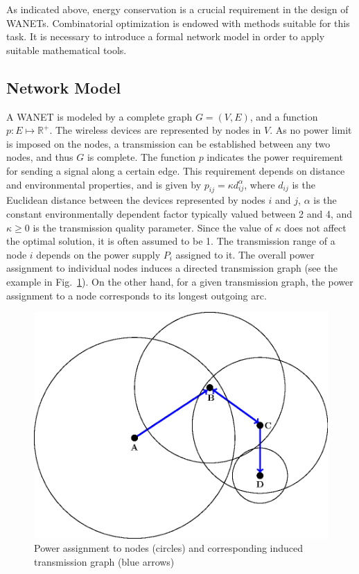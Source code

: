 As indicated above, energy conservation is a crucial requirement in the design of WANETs. 
Combinatorial optimization is endowed with methods suitable for this task. 
It is necessary to introduce a formal network model in order to apply suitable mathematical tools.

\subsection{Network Model}

A WANET is modeled by a complete graph $G=(V,E)$, and a function $p:E\mapsto \mathbb{R}^+$.
The wireless devices are represented by nodes in $V$. 
As no power limit is imposed on the nodes, a transmission can be established between any two nodes, and thus $G$ is complete.
The function $p$ indicates the power requirement for sending a signal along a certain edge.
This requirement depends on distance and environmental properties, and is given by  $p_{ij}=\kappa d_{ij}^\alpha$, 
where $d_{ij}$ is the Euclidean distance between the devices represented by nodes $i$ and $j$, $\alpha$ is the constant environmentally dependent factor typically valued between 2 and 4,
and $\kappa\geq 0$ is the transmission quality parameter. 
Since the value of $\kappa$ does not affect the optimal solution, it is often assumed to be 1.
The transmission range of a node $i$ depends on the power supply $P_i$ assigned to it.
The overall power assignment to individual nodes induces a directed transmission graph (see the example in Fig.~\ref{fig:transgraph}). 
On the other hand, for a given transmission graph, the power assignment to a node corresponds to its longest outgoing arc.
\begin{figure}[htb!]
  \centering
  \includegraphics[scale=.8]{figurer/tran-graph.eps}
  \caption{Power assignment to nodes (circles)  and corresponding induced transmission graph (blue arrows)}
  \label{fig:transgraph}
\end{figure}
